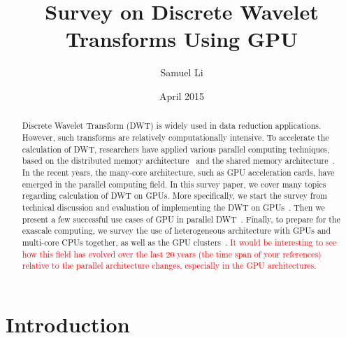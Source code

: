 \documentclass{article}
\title{Survey on Discrete Wavelet Transforms Using GPU}
\author{Samuel Li}
\date{April 2015}
\newcommand{\fix}[1]{\textcolor{red}{#1}} %
\begin{document}
\maketitle

\begin{abstract}
Discrete Wavelet Transform (DWT) is widely used in data reduction applications.
%
However, such transforms are relatively computationally intensive.
%
To accelerate the calculation of DWT, researchers have applied various parallel
computing techniques, based on the distributed memory architecture~\cite{
chadha2002scalable, woo1995parallel, uhl1996wavelet, nielsen1997scalable}
and the shared memory architecture~\cite{
lucka2000parallel, uhl2000optimization,kutil1999hardware}.
%
In the recent years, the many-core architecture, such as GPU acceleration 
cards, have emerged in the parallel computing field.
%
In this survey paper, we cover many topics regarding calculation of DWT on GPUs.
%
More specifically, we start the survey from technical discussion and evaluation
of implementing the DWT on GPUs~\cite{tenllado2008parallel, van2011accelerating,
garcia2005gpu}.
%
Then we present a few successful use cases of GPU in parallel DWT~\cite{
strengert2004hierarchical, strengert2006pyramid, wong2007discrete}.
%
Finally, to prepare for the exascale computing, we survey the use of 
heterogeneous architecture with GPUs and multi-core CPUs together,
as well as the GPU clusters~\cite{franco2009parallel, franco2010parallel,
strengert2005large, franco20122d, rossinelli2011multicore}.
%
\fix{It would be interesting to see how this
field has evolved over the last 20 years (the time span of your
references) relative to the parallel architecture changes, especially in
the GPU architectures.}
\end{abstract}

\section{Introduction}




\end{document}
